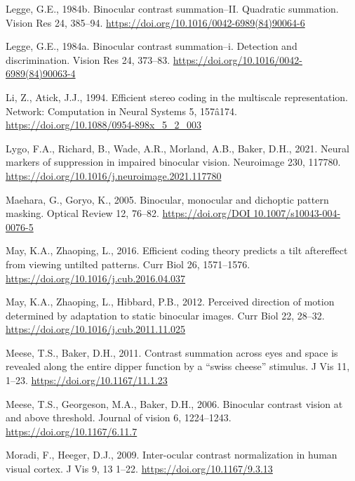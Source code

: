 \documentclass[
  12pt,
]{article}
\newlength{\cslhangindent}
\newenvironment{CSLReferences}[2] %
 {\begin{list}{}{%
  \setlength{\itemindent}{0pt}
  \setlength{\leftmargin}{0pt}
  \setlength{\parsep}{0pt}
  \ifodd #1
   \setlength{\leftmargin}{\cslhangindent}
   \setlength{\itemindent}{-1\cslhangindent}
  \fi
  \setlength{\itemsep}{#2\baselineskip}}}
 {\end{list}}
\begin{document}
\begin{CSLReferences}{1}{0}
Legge, G.E., 1984b. Binocular contrast summation--II. Quadratic
summation. Vision Res 24, 385--94.
\url{https://doi.org/10.1016/0042-6989(84)90064-6}

Legge, G.E., 1984a. Binocular contrast summation--i. Detection and
discrimination. Vision Res 24, 373--83.
\url{https://doi.org/10.1016/0042-6989(84)90063-4}

Li, Z., Atick, J.J., 1994. Efficient stereo coding in the multiscale
representation. Network: Computation in Neural Systems 5, 157â174.
\url{https://doi.org/10.1088/0954-898x_5_2_003}

Lygo, F.A., Richard, B., Wade, A.R., Morland, A.B., Baker, D.H., 2021.
Neural markers of suppression in impaired binocular vision. Neuroimage
230, 117780. \url{https://doi.org/10.1016/j.neuroimage.2021.117780}

Maehara, G., Goryo, K., 2005. Binocular, monocular and dichoptic pattern
masking. Optical Review 12, 76--82.
\href{https://doi.org/DOI\%2010.1007/s10043-004-0076-5}{https://doi.org/DOI
10.1007/s10043-004-0076-5}

May, K.A., Zhaoping, L., 2016. Efficient coding theory predicts a tilt
aftereffect from viewing untilted patterns. Curr Biol 26, 1571--1576.
\url{https://doi.org/10.1016/j.cub.2016.04.037}

May, K.A., Zhaoping, L., Hibbard, P.B., 2012. Perceived direction of
motion determined by adaptation to static binocular images. Curr Biol
22, 28--32. \url{https://doi.org/10.1016/j.cub.2011.11.025}

Meese, T.S., Baker, D.H., 2011. Contrast summation across eyes and space
is revealed along the entire dipper function by a {``swiss cheese''}
stimulus. J Vis 11, 1--23. \url{https://doi.org/10.1167/11.1.23}

Meese, T.S., Georgeson, M.A., Baker, D.H., 2006. Binocular contrast
vision at and above threshold. Journal of vision 6, 1224--1243.
\url{https://doi.org/10.1167/6.11.7}

Moradi, F., Heeger, D.J., 2009. Inter-ocular contrast normalization in
human visual cortex. J Vis 9, 13 1--22.
\url{https://doi.org/10.1167/9.3.13}


\end{CSLReferences}
\end{document}
